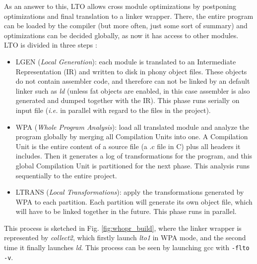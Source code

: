 \documentclass[runningheads]{llncs}
\begin{document}
As an answer to this, LTO allows cross module optimizations by
postponing optimizations and final translation to a linker wrapper. There, the entire
program can be loaded by the compiler (but more often, just some sort of summary)
and optimizations can be decided globally, as now it has access to other modules. LTO is divided in three steps
\cite{whoprgoogle,glek2010optimizing}:
\begin{itemize}
\item LGEN (\textit{Local Generation}): each module is translated to an Intermediate
Representation (IR) and written to disk in phony object files. These objects do
not contain assembler code, and therefore can not be linked by an default linker
such as \textit{ld} (unless fat objects are enabled, in this case assembler is also
generated and dumped together with the IR). This phase runs serially
on input file (\textit{i.e.} in parallel with regard to the files in the project).

\item WPA (\textit{Whole Program Analysis}): load all translated module and analyze
the program globally by merging all Compilation Units into one. A Compilation Unit
is the entire content of a source file (a .c file in C) plus all headers it includes.
Then it generates a log of transformations for the program, and this global
Compilation Unit is partitioned for the next phase. This analysis runs sequentially
to the entire project.

\item LTRANS (\textit{Local Transformations}): apply the transformations generated by
WPA to each partition. Each partition will generate its own object file, which will
have to be linked together in the future. This phase runs in parallel.
\end{itemize}

This process is sketched in Fig. \ref{fig:whopr_build}, where the linker wrapper is
represented by \textit{collect2}, which firstly launch \textit{lto1} in WPA mode, and the second
time it finally launches \textit{ld}. This process can be seen by launching gcc with \texttt{-flto -v}.
\end{document}
